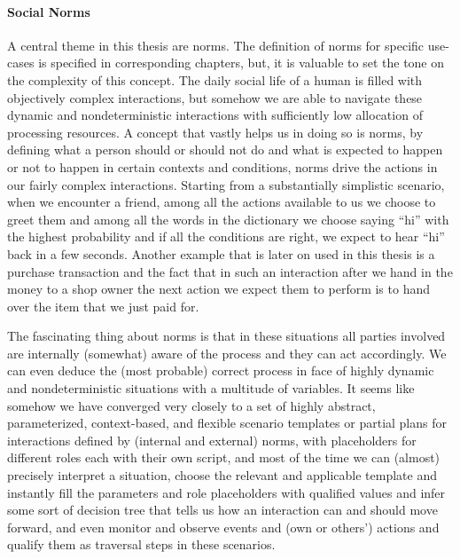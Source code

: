 \paragraph{Social Norms}
A central theme in this thesis are norms. The definition of norms for specific use-cases is specified in corresponding chapters, but, it is valuable to set the tone on the complexity of this concept. The daily social life of a human is filled with objectively complex interactions, but somehow we are able to navigate these dynamic and nondeterministic interactions with sufficiently low allocation of processing resources. A concept that vastly helps us in doing so is norms, by defining what a person should or should not do and what is expected to happen or not to happen in certain contexts and conditions, norms drive the actions in our fairly complex interactions. Starting from a substantially simplistic scenario, when we encounter a friend, among all the actions available to us we choose to greet them and among all the words in the dictionary we choose saying ``hi'' with the highest probability and if all the conditions are right, we expect to hear ``hi'' back in a few seconds. Another example that is later on used in this thesis is a purchase transaction and the fact that in such an interaction after we hand in the money to a shop owner the next action we expect them to perform is to hand over the item that we just paid for.


The fascinating thing about norms is that in these situations all parties involved are internally (somewhat) aware of the process and they can act accordingly. We can even deduce the (most probable) correct process in face of highly dynamic and nondeterministic situations with a multitude of variables. It seems like somehow we have converged very closely to a set of highly abstract, parameterized, context-based, and flexible scenario templates or partial plans for interactions defined by (internal and external) norms, with placeholders for different roles each with their own script, and most of the time we can (almost) precisely interpret a situation, choose the relevant and applicable template and instantly fill the parameters and role placeholders with qualified values and infer some sort of decision tree that tells us how an interaction can and should move forward, and even monitor and observe events and (own or others') actions and qualify them as traversal steps in these scenarios.


